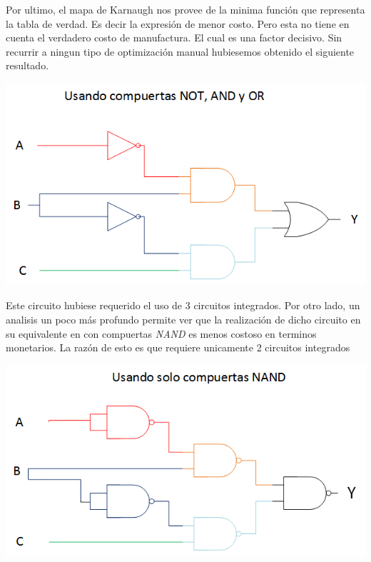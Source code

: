 Por ultimo, el mapa de Karnaugh nos provee de la minima función que representa la tabla de verdad. Es decir la expresión de menor costo. Pero esta no tiene en cuenta el verdadero costo de manufactura. El cual es una factor decisivo. 
Sin recurrir a ningun tipo de optimización manual hubiesemos obtenido el siguiente resultado.
\begin{center}
\includegraphics[scale = 0.8,keepaspectratio]{../3-TruthTable/Circuito AND, OR ,NOT.png}
\end{center}
Este circuito hubiese requerido el uso de 3 circuitos integrados. 
Por otro lado, un analisis un poco más profundo permite ver que la realización de dicho circuito en su equivalente en con compuertas \emph{NAND} es menos costoso en terminos monetarios. La razón de esto es que requiere unicamente 2 circuitos integrados
\begin{center}
\includegraphics[scale = 0.8,keepaspectratio]{../3-TruthTable/Circuito Logico.png}
\end{center}
 